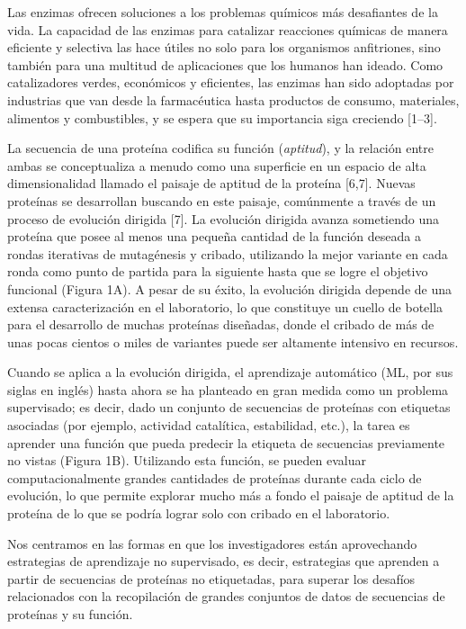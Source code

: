 \documentclass[12pt]{article}
\begin{document}
Las enzimas ofrecen soluciones a los problemas químicos más desafiantes de la vida. La capacidad de las enzimas para catalizar reacciones químicas de manera eficiente y selectiva las hace útiles no solo para los organismos anfitriones, sino también para una multitud de aplicaciones que los humanos han ideado. Como catalizadores verdes, económicos y eficientes, las enzimas han sido adoptadas por industrias que van desde la farmacéutica hasta productos de consumo, materiales, alimentos y combustibles, y se espera que su importancia siga creciendo [1–3].


La secuencia de una proteína codifica su función (\textit{aptitud}), y la relación entre ambas se conceptualiza a menudo como una superficie en un espacio de alta dimensionalidad llamado el paisaje de aptitud de la proteína [6,7]. Nuevas proteínas se desarrollan buscando en este paisaje, comúnmente a través de un proceso de evolución dirigida [7]. La evolución dirigida avanza sometiendo una proteína que posee al menos una pequeña cantidad de la función deseada a rondas iterativas de mutagénesis y cribado, utilizando la mejor variante en cada ronda como punto de partida para la siguiente hasta que se logre el objetivo funcional (Figura 1A). A pesar de su éxito, la evolución dirigida depende de una extensa caracterización en el laboratorio, lo que constituye un cuello de botella para el desarrollo de muchas proteínas diseñadas, donde el cribado de más de unas pocas cientos o miles de variantes puede ser altamente intensivo en recursos.

Cuando se aplica a la evolución dirigida, el aprendizaje automático (ML, por sus siglas en inglés) hasta ahora se ha planteado en gran medida como un problema supervisado; es decir, dado un conjunto de secuencias de proteínas con etiquetas asociadas (por ejemplo, actividad catalítica, estabilidad, etc.), la tarea es aprender una función que pueda predecir la etiqueta de secuencias previamente no vistas (Figura 1B). Utilizando esta función, se pueden evaluar computacionalmente grandes cantidades de proteínas durante cada ciclo de evolución, lo que permite explorar mucho más a fondo el paisaje de aptitud de la proteína de lo que se podría lograr solo con cribado en el laboratorio.

Nos centramos en las formas en que los investigadores están aprovechando estrategias de aprendizaje no supervisado, es decir, estrategias que aprenden a partir de secuencias de proteínas no etiquetadas, para superar los desafíos relacionados con la recopilación de grandes conjuntos de datos de secuencias de proteínas y su función.
\end{document}
